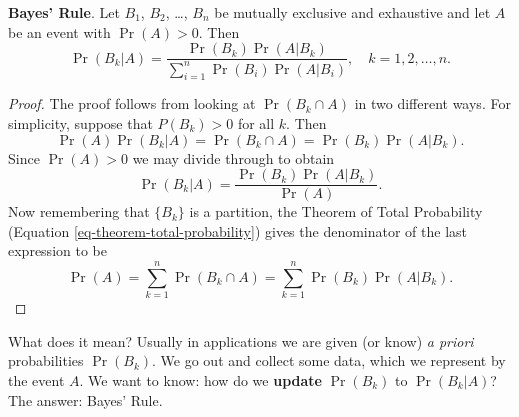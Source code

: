 \documentclass[captions=tableheading]{scrbook}
\begin{document}
\begin{thm}
\textbf{Bayes' Rule}. Let \(B_{1}\), \(B_{2}\), \ldots{}, \(B_{n}\) be mutually exclusive and exhaustive and let \(A\) be an event with \(\Pr(A)>0\). Then 
\begin{equation}
\Pr(B_{k}|A)=\frac{\Pr(B_{k})\Pr(A|B_{k})}{\sum_{i=1}^{n}\Pr(B_{i})\Pr(A|B_{i})},\quad k=1,2,\ldots,n.\label{eq-bayes-rule}
\end{equation}
\end{thm}

\begin{proof}
The proof follows from looking at \(\Pr(B_{k}\cap A)\) in two different ways. For simplicity, suppose that \(P(B_{k})>0\) for all \(k\). Then
\[
\Pr(A)\Pr(B_{k}|A)=\Pr(B_{k}\cap A)=\Pr(B_{k})\Pr(A|B_{k}).
\]
Since \(\Pr(A)>0\) we may divide through to obtain 
\[
\Pr(B_{k}|A)=\frac{\Pr(B_{k})\Pr(A|B_{k})}{\Pr(A)}.
\]
Now remembering that \(\{ B_{k} \}\) is a partition, the Theorem of Total Probability (Equation \ref{eq-theorem-total-probability}) gives the denominator of the last expression to be
\[
\Pr(A)=\sum_{k=1}^{n}\Pr(B_{k}\cap A)=\sum_{k=1}^{n}\Pr(B_{k})\Pr(A|B_{k}).
\]
\end{proof}

What does it mean? Usually in applications we are given (or know) \emph{a priori} probabilities \(\Pr(B_{k})\). We go out and collect some data, which we represent by the event \(A\). We want to know: how do we \textbf{update} \(\Pr(B_{k})\) to \(\Pr(B_{k}|A)\)? The answer: Bayes' Rule.
\end{document}
